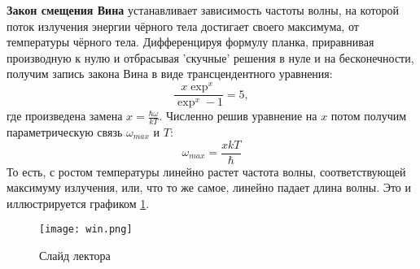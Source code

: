 \textbf{Закон смещения Вина} устанавливает зависимость частоты волны, на которой поток излучения энергии чёрного тела достигает своего максимума, от температуры чёрного тела. Дифференцируя формулу планка, приравнивая производную к нулю и отбрасывая 'скучные' решения в нуле и на бесконечности, получим запись закона Вина в виде трансцендентного уравнения:
\begin{equation}
    \frac{x\exp^x}{\exp^x - 1} = 5,
\end{equation}
где произведена замена \(x = \frac{\hbar \omega}{kT}\). Численно решив уравнение на \(x\) потом получим параметрическую связь \(\omega_{max}\) и \(T\):
\begin{equation}
    \omega_{max} = \frac{xkT}{\hbar}
\end{equation}
То есть, с ростом температуры линейно растет частота волны, соответствующей максимуму излучения, или, что то же самое, линейно падает длина волны. Это и иллюстрируется графиком \ref{win}.
\begin{figure}
    \centering
    \texttt{[image: win.png]}
    \caption{Слайд лектора}
    \label{win}
\end{figure}
